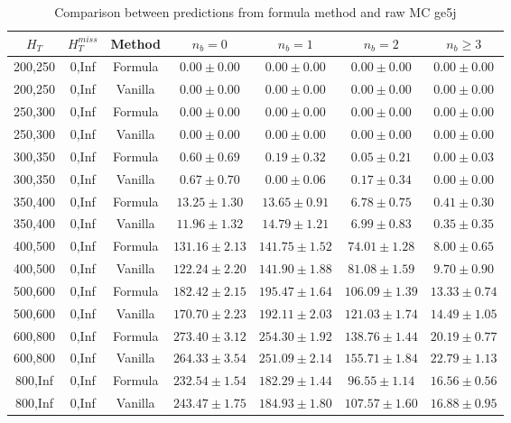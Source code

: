 \begin{longtable}{ | c | c | c | c | c | c | c | }
\caption{Comparison between predictions from formula method and raw MC ge5j} \label{tab:ge5j} \\    \hline 
$H_{T}$ & $H_{T}^{miss}$ & Method & $n_{b} = 0$ & $n_{b} = 1$ & $n_{b} = 2$ & $n_{b} \ge 3$ \\ \hline200,250 & 0,Inf & Formula  & $     0.00 \pm  0.00 $ & $     0.00 \pm  0.00 $ & $     0.00 \pm  0.00 $ & $     0.00 \pm  0.00 $  \\  
200,250 & 0,Inf & Vanilla  & $     0.00 \pm  0.00 $ & $     0.00 \pm  0.00 $ & $     0.00 \pm  0.00 $ & $     0.00 \pm  0.00 $  \\ \hline 
250,300 & 0,Inf & Formula  & $     0.00 \pm  0.00 $ & $     0.00 \pm  0.00 $ & $     0.00 \pm  0.00 $ & $     0.00 \pm  0.00 $  \\  
250,300 & 0,Inf & Vanilla  & $     0.00 \pm  0.00 $ & $     0.00 \pm  0.00 $ & $     0.00 \pm  0.00 $ & $     0.00 \pm  0.00 $  \\ \hline 
300,350 & 0,Inf & Formula  & $     0.60 \pm  0.69 $ & $     0.19 \pm  0.32 $ & $     0.05 \pm  0.21 $ & $     0.00 \pm  0.03 $  \\  
300,350 & 0,Inf & Vanilla  & $     0.67 \pm  0.70 $ & $     0.00 \pm  0.06 $ & $     0.17 \pm  0.34 $ & $     0.00 \pm  0.00 $  \\ \hline 
350,400 & 0,Inf & Formula  & $    13.25 \pm  1.30 $ & $    13.65 \pm  0.91 $ & $     6.78 \pm  0.75 $ & $     0.41 \pm  0.30 $  \\  
350,400 & 0,Inf & Vanilla  & $    11.96 \pm  1.32 $ & $    14.79 \pm  1.21 $ & $     6.99 \pm  0.83 $ & $     0.35 \pm  0.35 $  \\ \hline 
400,500 & 0,Inf & Formula  & $   131.16 \pm  2.13 $ & $   141.75 \pm  1.52 $ & $    74.01 \pm  1.28 $ & $     8.00 \pm  0.65 $  \\  
400,500 & 0,Inf & Vanilla  & $   122.24 \pm  2.20 $ & $   141.90 \pm  1.88 $ & $    81.08 \pm  1.59 $ & $     9.70 \pm  0.90 $  \\ \hline 
500,600 & 0,Inf & Formula  & $   182.42 \pm  2.15 $ & $   195.47 \pm  1.64 $ & $   106.09 \pm  1.39 $ & $    13.33 \pm  0.74 $  \\  
500,600 & 0,Inf & Vanilla  & $   170.70 \pm  2.23 $ & $   192.11 \pm  2.03 $ & $   121.03 \pm  1.74 $ & $    14.49 \pm  1.05 $  \\ \hline 
600,800 & 0,Inf & Formula  & $   273.40 \pm  3.12 $ & $   254.30 \pm  1.92 $ & $   138.76 \pm  1.44 $ & $    20.19 \pm  0.77 $  \\  
600,800 & 0,Inf & Vanilla  & $   264.33 \pm  3.54 $ & $   251.09 \pm  2.14 $ & $   155.71 \pm  1.84 $ & $    22.79 \pm  1.13 $  \\ \hline 
800,Inf & 0,Inf & Formula  & $   232.54 \pm  1.54 $ & $   182.29 \pm  1.44 $ & $    96.55 \pm  1.14 $ & $    16.56 \pm  0.56 $  \\  
800,Inf & 0,Inf & Vanilla  & $   243.47 \pm  1.75 $ & $   184.93 \pm  1.80 $ & $   107.57 \pm  1.60 $ & $    16.88 \pm  0.95 $  \\ \hline 
    \hline 
    \hline 
\end{longtable}
